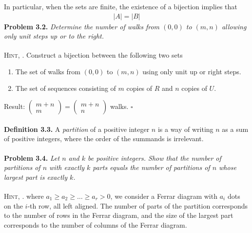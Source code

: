 \documentclass[a4paper,oneside]{article}
\numberwithin{equation}{section}
\begin{document}
In particular, when the sets are finite, the existence of a bijection implies that 
\begin{align}
\left| A \right| = \left| B \right|
\end{align}
\textbf{Problem 3.2.} \textit{Determine the number of walks from $\left(0,0\right)$ to $\left(m,n\right)$ allowing only unit steps up or to the right.}\\
\\
\textsc{Hint, \cite{4}.}  Construct a bijection between the following two sets
\begin{enumerate}
\item The set of walks from $\left(0,0\right)$ to $\left(m,n\right)$ using only unit up or right steps.
\item The set of sequences consisting of $m$ copies of $R$ and $n$ copies of $U$.
\end{enumerate}
Result: $\left( {\begin{array}{*{20}{c}}
{m + n}\\
m
\end{array}} \right) = \left( {\begin{array}{*{20}{c}}
{m + n}\\
n
\end{array}} \right)$ walks. \hfill $\square$\\
\\
\textbf{Definition 3.3.} A \textit{partition}  of a positive integer $n$ is a way of writing $n$ as a sum of positive integers, where the order of the summands is irrelevant.\\
\\
\textbf{Problem 3.4.} \textit{Let $n$ and $k$ be positive integers. Show that the number of partitions of $n$ with exactly $k$ parts equals the number of partitions of $n$ whose largest part is exactly $k$.}\\
\\
\textsc{Hint, \cite{4}.} where $a_1\ge a_2\ge \ldots \ge a_r>0$, we consider a Ferrar diagram with $a_i$ dots on the $i$-th row, all left aligned. The number of parts of the partition corresponds to the number of rows in the Ferrar diagram, and the size of the largest part corresponds to the number of columns of the Ferrar diagram. 
\end{document}
